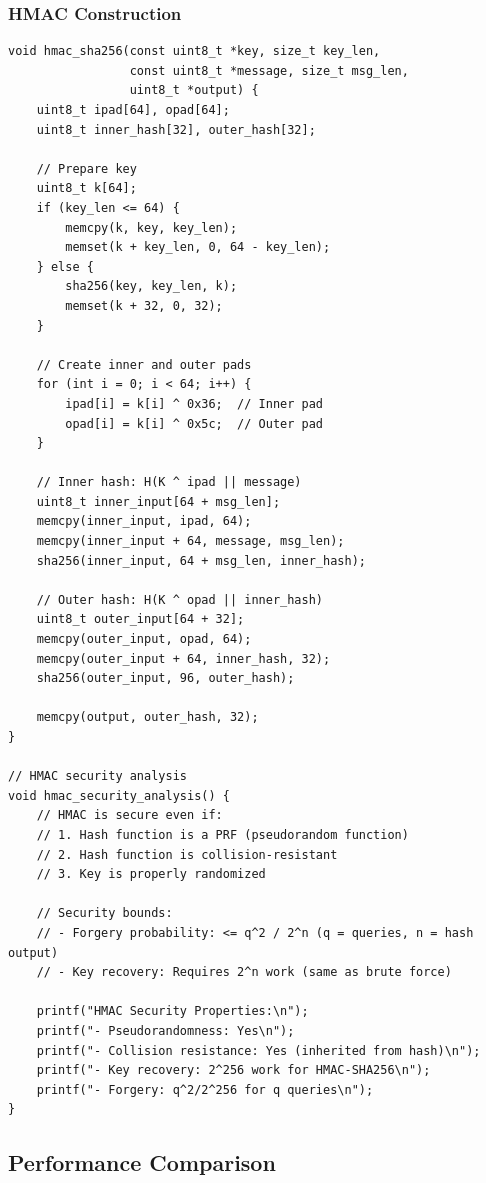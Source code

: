 \subsubsection{HMAC Construction}

\begin{lstlisting}[style=cstyle, caption={HMAC Implementation}]
void hmac_sha256(const uint8_t *key, size_t key_len,
                 const uint8_t *message, size_t msg_len,
                 uint8_t *output) {
    uint8_t ipad[64], opad[64];
    uint8_t inner_hash[32], outer_hash[32];
    
    // Prepare key
    uint8_t k[64];
    if (key_len <= 64) {
        memcpy(k, key, key_len);
        memset(k + key_len, 0, 64 - key_len);
    } else {
        sha256(key, key_len, k);
        memset(k + 32, 0, 32);
    }
    
    // Create inner and outer pads
    for (int i = 0; i < 64; i++) {
        ipad[i] = k[i] ^ 0x36;  // Inner pad
        opad[i] = k[i] ^ 0x5c;  // Outer pad
    }
    
    // Inner hash: H(K ^ ipad || message)
    uint8_t inner_input[64 + msg_len];
    memcpy(inner_input, ipad, 64);
    memcpy(inner_input + 64, message, msg_len);
    sha256(inner_input, 64 + msg_len, inner_hash);
    
    // Outer hash: H(K ^ opad || inner_hash)
    uint8_t outer_input[64 + 32];
    memcpy(outer_input, opad, 64);
    memcpy(outer_input + 64, inner_hash, 32);
    sha256(outer_input, 96, outer_hash);
    
    memcpy(output, outer_hash, 32);
}

// HMAC security analysis
void hmac_security_analysis() {
    // HMAC is secure even if:
    // 1. Hash function is a PRF (pseudorandom function)
    // 2. Hash function is collision-resistant
    // 3. Key is properly randomized
    
    // Security bounds:
    // - Forgery probability: <= q^2 / 2^n (q = queries, n = hash output)
    // - Key recovery: Requires 2^n work (same as brute force)
    
    printf("HMAC Security Properties:\n");
    printf("- Pseudorandomness: Yes\n");
    printf("- Collision resistance: Yes (inherited from hash)\n");
    printf("- Key recovery: 2^256 work for HMAC-SHA256\n");
    printf("- Forgery: q^2/2^256 for q queries\n");
}
\end{lstlisting}

\subsection{Performance Comparison}

